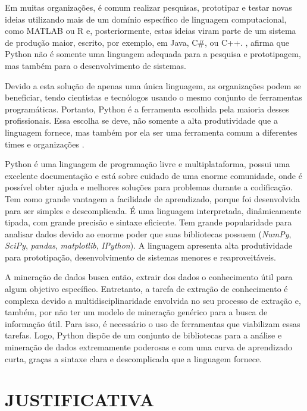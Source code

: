 Em muitas organizações, é comum realizar pesquisas, prototipar e testar novas ideias utilizando mais de um domínio específico de linguagem computacional, como MATLAB ou R e, posteriormente, estas ideias viram parte de um sistema de produção maior, escrito, por exemplo, em Java, C\#, ou C++. , afirma que Python não é somente uma linguagem adequada para a pesquisa e prototipagem, mas também para o desenvolvimento de sistemas.

Devido a esta solução de apenas uma única linguagem, as organizações podem se beneficiar, tendo cientistas e tecnólogos usando o mesmo conjunto de ferramentas programáticas. Portanto, Python é a ferramenta escolhida pela maioria desses profissionais. Essa escolha se deve, não somente a alta produtividade que a linguagem fornece, mas também por ela ser uma ferramenta comum a diferentes times e organizações \cite{kaldero}. 

Python é uma linguagem de programação livre e multiplataforma, possui uma excelente documentação e está sobre cuidado de uma enorme comunidade, onde é possível obter ajuda e melhores soluções para problemas durante a codificação. Tem como grande vantagem a facilidade de aprendizado, porque foi desenvolvida para ser simples e descomplicada. É uma linguagem interpretada, dinâmicamente tipada, com grande precisão e sintaxe eficiente. Tem grande popularidade para analisar dados devido ao enorme poder que suas bibliotecas possuem (\textit{NumPy}, \textit{SciPy}, \textit{pandas}, \textit{matplotlib}, \textit{IPython}). A linguagem apresenta alta produtividade para prototipação, desenvolvimento de sistemas menores e reaproveitáveis.

A mineração de dados busca então, extrair dos dados o conhecimento útil para algum objetivo específico. Entretanto, a tarefa de extração de conhecimento é complexa devido a multidisciplinaridade envolvida no seu processo de extração e, também, por não ter um modelo de mineração genérico para a busca de informação útil. Para isso, é necessário o uso de ferramentas que viabilizam essas tarefas. Logo, Python dispõe de um conjunto de bibliotecas para a análise e mineração de dados extremamente poderosas e com uma curva de aprendizado curta, graças a sintaxe clara e descomplicada que a linguagem fornece.


\section{JUSTIFICATIVA}\label{sec:justificativa}

